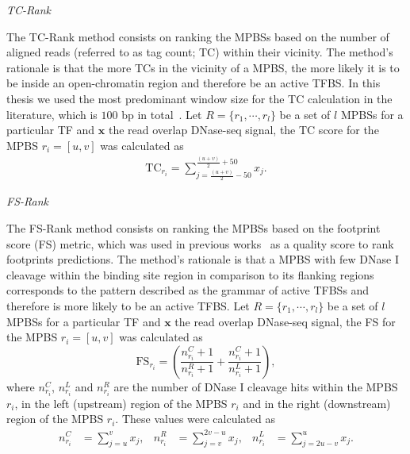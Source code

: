 \vspace{0.5cm}
\noindent
\emph{TC-Rank}
\vspace{0.3cm}

\noindent
The TC-Rank method consists on ranking the MPBSs based on the number of aligned reads (referred to as tag count; TC) within their vicinity. The method's rationale is that the more TCs in the vicinity of a MPBS, the more likely it is to be inside an open-chromatin region and therefore be an active TFBS. In this thesis we used the most predominant window size for the TC calculation in the literature, which is $100$ bp in total~\citep{cuellar2012,yardimci2014,he2014}. Let $R = \{ {r}_{1}, \cdots, {r}_{l} \}$ be a set of $l$ MPBSs for a particular TF and $\mathbf{x}$ the read overlap DNase-seq signal, the TC score for the MPBS ${r}_{i} = [u,v]$ was calculated as
\begin{align}
\text{TC}_{{r}_{i}} = \sum_{j=\frac{(u+v)}{2} - 50}^{\frac{(u+v)}{2} + 50} {x}_{j}.
\label{eq:tc.exp}
\end{align}

\vspace{0.5cm}
\noindent
\emph{FS-Rank}
\vspace{0.3cm}

\noindent
The FS-Rank method consists on ranking the MPBSs based on the footprint score (FS) metric, which was used in previous works~\citep{neph2012a,he2014} as a quality score to rank footprints predictions. The method's rationale is that a MPBS with few DNase I cleavage within the binding site region in comparison to its flanking regions corresponds to the pattern described as the grammar of active TFBSs and therefore is more likely to be an active TFBS. Let $R = \{ {r}_{1}, \cdots, {r}_{l} \}$ be a set of $l$ MPBSs for a particular TF and $\mathbf{x}$ the read overlap DNase-seq signal, the FS for the MPBS ${r}_{i} = [u,v]$ was calculated as
\begin{equation}
  \label{eq:fs1.exp}
  \text{FS}_{r_i} = \left(\frac{{n}^{C}_{r_i}+1}{{n}^{R}_{r_i}+1} + \frac{{n}^{C}_{r_i}+1}{{n}^{L}_{r_i}+1}\right),
\end{equation}
where ${n}^{C}_{r_i}$, ${n}^{L}_{r_i}$ and ${n}^{R}_{r_i}$ are the number of DNase I cleavage hits within the MPBS $r_i$, in the left (upstream) region of the MPBS $r_i$ and in the right (downstream) region of the MPBS $r_i$. These values were calculated as
\begin{align}
  \label{eq:fs2.exp}
  {n}^{C}_{r_i} &= \sum_{j=u}^{v} {x}_{j}, &
  {n}^{R}_{r_i} &= \sum_{j=v}^{2v-u} {x}_{j}, &
  {n}^{L}_{r_i} &= \sum_{j=2u-v}^{u} {x}_{j}.
\end{align}


